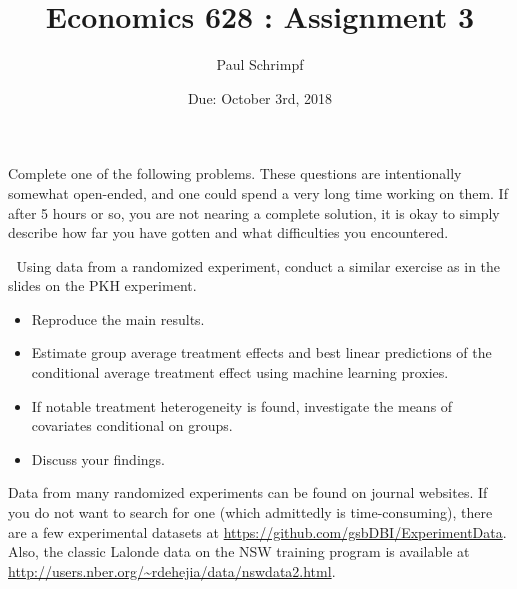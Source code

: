 

\title{Economics 628 : Assignment 3}
\author{Paul Schrimpf}
\date{Due: October 3rd, 2018}


\maketitle

Complete one of the following problems. These questions are
intentionally somewhat open-ended, and one could spend a very long
time working on them. If after 5 hours or so, you are not nearing a
complete solution, it is okay to simply describe how far you have
gotten and what difficulties you encountered. 

\begin{problem}$\;$
  Using data from a randomized experiment, conduct a similar exercise
  as in the slides on the PKH experiment.
  \begin{itemize}
  \item Reproduce the main results.
  \item Estimate group average treatment effects and best linear
    predictions of the conditional average treatment effect using
    machine learning proxies.
  \item If notable treatment heterogeneity is found, investigate the
    means of covariates conditional on groups.
  \item Discuss your findings.
  \end{itemize}
  Data from many randomized experiments can be
  found on journal websites. If you do not want to search for one
  (which admittedly is time-consuming), there are a few experimental
  datasets at \url{https://github.com/gsbDBI/ExperimentData}.
  Also, the classic Lalonde data on the NSW  training program is
  available at  
  \url{http://users.nber.org/~rdehejia/data/nswdata2.html}. 
\end{problem}

